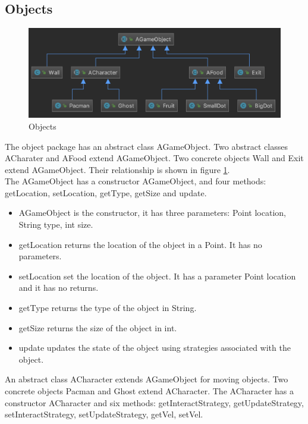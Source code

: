 \documentclass[letterpaper, 11pt]{article}
\begin{document}
\subsection{Objects}
\begin{figure}[htbp] 
\centering
\includegraphics[width=.85\linewidth]{objects.png} 
  \caption{Objects}
  \label{fig1} 
\end{figure}
The object package has an abstract class AGameObject. Two abstract classes ACharater and AFood extend AGameObject. Two concrete objects Wall and Exit extend AGameObject.  Their relationship is shown in figure \ref{fig1}.\\

The AGameObject has a constructor AGameObject, and four methods: getLocation, setLocation, getType, getSize and update. 

\begin{itemize}
\item AGameObject is the constructor, it has three parameters: Point location, String type, int size. 
\item getLocation returns the location of the object in a Point. It has no parameters.
\item setLocation set the location of the object. It has a parameter Point location and it has no returns.
\item getType returns the type of the object in String.
\item getSize returns the size of the object in int.
\item update updates the state of the object using strategies associated with the object.
\end{itemize}

An abstract class ACharacter extends AGameObject for moving objects. Two concrete objects Pacman and Ghost extend ACharacter.  The ACharacter has a constructor ACharacter and six methods: getInteractStrategy, getUpdateStrategy,  setInteractStrategy, setUpdateStrategy, getVel, setVel. 
\end{document}
